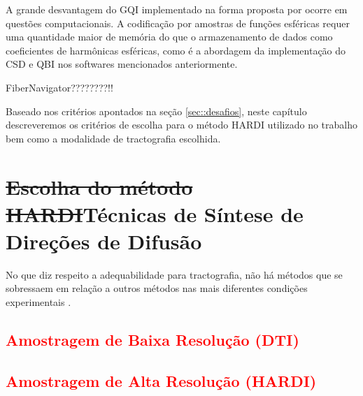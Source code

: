 \documentclass[
    12pt,                %
    oneside,            %
    a4paper,            %
    english,            %
    french,                %
    spanish,            %
    brazil                %
    ]{abntex2}
\begin{document}
A grande desvantagem do GQI implementado na forma proposta por  ocorre em questões computacionais. A codificação por amostras de funções esféricas requer uma quantidade maior de memória do que o armazenamento de dados como coeficientes de harmônicas esféricas, como é a abordagem da implementação do CSD e QBI nos softwares mencionados anteriormente.

FiberNavigator????????!!




Baseado nos critérios apontados na seção \ref{sec::desafios}, neste capítulo descreveremos os critérios de escolha para o método HARDI utilizado no trabalho bem como a modalidade de tractografia escolhida.

\section{\sout{Escolha do método HARDI}Técnicas de Síntese de Direções de Difusão}

No que diz respeito a adequabilidade para tractografia, não há métodos que se sobressaem em relação a outros métodos nas mais diferentes condições experimentais \cite{SCHILLING2019194}.


\textcolor{red}{\subsection{Amostragem de Baixa Resolução (DTI)}} 

\textcolor{red}{\subsection{Amostragem de Alta Resolução (HARDI)}}
\end{document}
